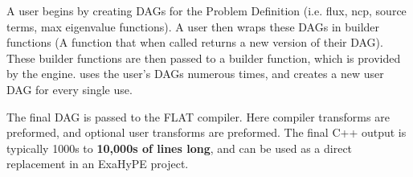 A user begins by creating DAGs for the Problem Definition (i.e. flux, ncp, source terms, max eigenvalue functions).
A user then wraps these DAGs in builder functions (A function that when called returns a new version of their DAG).
These builder functions are then passed to a  builder function, which is provided by the engine.
 uses the user's DAGs numerous times, and creates a new user DAG for every single use.

The final  DAG is passed to the FLAT compiler.
Here compiler transforms are preformed, and optional user transforms are preformed.
The final C++ output is typically 1000s to \textbf{10,000s of lines long}, and can be used as a direct replacement in an ExaHyPE project.

